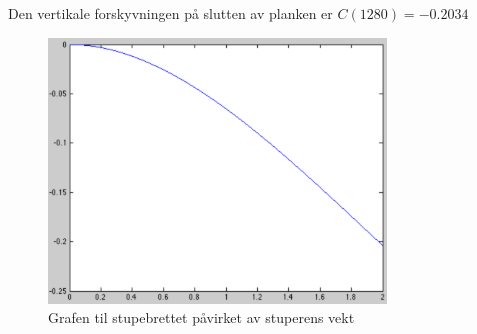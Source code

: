 Den vertikale forskyvningen på slutten av planken er $C(1280)=-0.2034$

\begin{figure}[h]
    \centering
    \includegraphics[width=0.8\textwidth]{sections/Exercise6/DiverGraph}
    \caption{Grafen til stupebrettet påvirket av stuperens vekt}
    \label{fig:divergraph}
\end{figure}

%